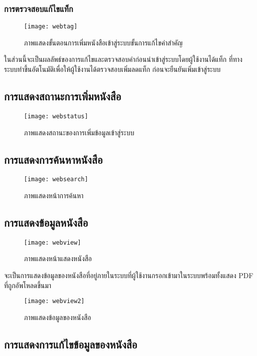 \subsubsection{การตรวจสอบแก้ไขแท็ก}
\begin{figure}[H]
    \centering
    \texttt{[image: webtag]}
    \caption{ภาพแสดงขั้นตอนการเพิ่มหนังสือเข้าสู่ระบบขั้นการแก้ไขคำสำคัญ}\label{fig:webtag}
\end{figure}
ในส่วนนี้จะเป็นผลลัพธ์ของการแก้ไขและตรวจสอบคำก่อนนำเข้าสู่ระบบโดยผู้ใช้งานได้แท็ก ที่ทางระบบทำขึ้นอัตโนมัติเพื่อให้ผู้ใช้งานได้ตรวจสอบเพิ่มลดแท็ก ก่อนจะยืนยันเพิ่มเข้าสู่ระบบ
\subsection{การแสดงสถานะการเพิ่มหนังสือ}
\begin{figure}[H]
    \centering
    \texttt{[image: webstatus]}
    \caption{ภาพแสดงสถานะของการเพิ่มข้อมูลเข้าสู่ระบบ}\label{fig:webstatus}
\end{figure}

\subsection{การแสดงการค้นหาหนังสือ}
\begin{figure}[H]
    \centering
    \texttt{[image: websearch]}
    \caption{ภาพแสดงหน้าการค้นหา}\label{fig:websearch}
\end{figure}

\subsection{การแสดงข้อมูลหนังสือ}
\begin{figure}[H]
    \centering
    \texttt{[image: webview]}
    \caption{ภาพแสดงหน้าแสดงหนังสือ}\label{fig:webview}
\end{figure}
จะเป็นการแสดงข้อมูลของหนังสือที่อยู่ภายในระบบที่ผู้ใช้งานกรอกเข้ามาในระบบพร้อมทั้งแสดง PDF ที่ถูกอัพโหลดขึ้นมา

\begin{figure}[H]
    \centering
    \texttt{[image: webview2]}
    \caption{ภาพแสดงข้อมูลของหนังสือ}\label{fig:webview2}
\end{figure}

\subsection{การแสดงการแก้ไขข้อมูลของหนังสือ}

